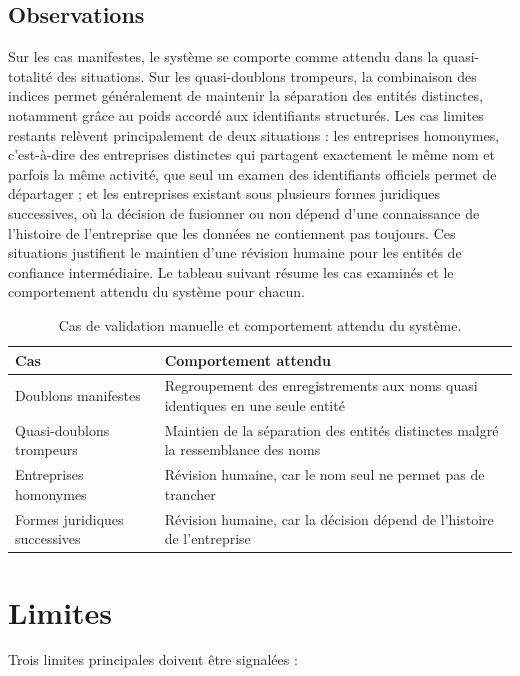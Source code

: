 \subsection{Observations}

Sur les cas manifestes, le système se comporte comme attendu dans la quasi-totalité des situations. Sur les quasi-doublons trompeurs, la combinaison des indices permet généralement de maintenir la séparation des entités distinctes, notamment grâce au poids accordé aux identifiants structurés. Les cas limites restants relèvent principalement de deux situations : les entreprises homonymes, c'est-à-dire des entreprises distinctes qui partagent exactement le même nom et parfois la même activité, que seul un examen des identifiants officiels permet de départager ; et les entreprises existant sous plusieurs formes juridiques successives, où la décision de fusionner ou non dépend d'une connaissance de l'histoire de l'entreprise que les données ne contiennent pas toujours. Ces situations justifient le maintien d'une révision humaine pour les entités de confiance intermédiaire. Le tableau suivant résume les cas examinés et le comportement attendu du système pour chacun.

\begin{table}[H]
\centering
\caption{Cas de validation manuelle et comportement attendu du système.}
\renewcommand{\arraystretch}{1.3}
\setlength{\tabcolsep}{3pt}
{\small
\begin{tabular}{|p{4.5cm}|p{9.1cm}|}
\hline
\textbf{Cas} & \textbf{Comportement attendu} \\
\hline
Doublons manifestes & Regroupement des enregistrements aux noms quasi identiques en une seule entité \\
\hline
Quasi-doublons trompeurs & Maintien de la séparation des entités distinctes malgré la ressemblance des noms \\
\hline
Entreprises homonymes & Révision humaine, car le nom seul ne permet pas de trancher \\
\hline
Formes juridiques successives & Révision humaine, car la décision dépend de l'histoire de l'entreprise \\
\hline
\end{tabular}
}
\end{table}

\section{Limites}

Trois limites principales doivent être signalées :


